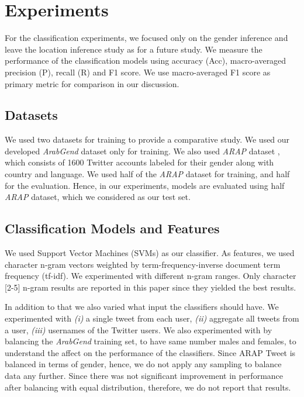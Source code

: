 \documentclass[sigconf,authorversion,nonacm]{acmart}
\begin{document}
\section{Experiments}
\label{sec:experiments}
For the classification experiments, we focused only on the gender inference and leave the location inference study as for a future study. We measure the performance of the classification models using accuracy (Acc), macro-averaged precision (P), recall (R) and F1 score. We use macro-averaged F1 score as primary metric for comparison in our discussion. 


\subsection{Datasets} 
We used two datasets for training to provide a comparative study. We used our developed \textit{ArabGend} dataset only for training. We also used \textit{ARAP} dataset \cite{charfi2019fine}, which consists of 1600 Twitter accounts labeled for their gender along with country and language. We used half of the \textit{ARAP} dataset for training, and half for the evaluation. Hence, in our experiments, models are evaluated using half \textit{ARAP} dataset, which we considered as our test set. 


\subsection{Classification Models and Features} We used Support Vector Machines (SVMs) as our classifier. As features, we used character n-gram vectors weighted by term-frequency-inverse document term frequency (tf-idf). We experimented with different n-gram ranges. Only character [2-5] n-gram results are reported in this paper since they yielded the best results.

In addition to that we also varied what input the classifiers should have. We experimented with {\em(i)} a single tweet from each user, {\em(ii)} aggregate all tweets from a user, {\em(iii)} usernames of the Twitter users. We also experimented with by balancing the \textit{ArabGend} training set, to have same number males and females, to understand the affect on the performance of the classifiers. Since ARAP Tweet is balanced in terms of gender, hence, we do not apply any sampling to balance data any further. Since there was not significant improvement in performance after balancing with equal distribution, therefore, we do not report that results. 
\end{document}
